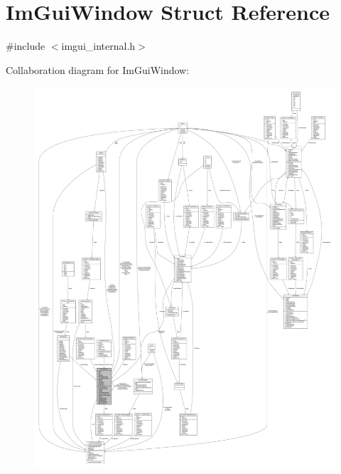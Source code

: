 \hypertarget{struct_im_gui_window}{}\section{Im\+Gui\+Window Struct Reference}
\label{struct_im_gui_window}


{\ttfamily \#include $<$imgui\+\_\+internal.\+h$>$}



Collaboration diagram for Im\+Gui\+Window\+:
\nopagebreak
\begin{figure}[H]
\begin{center}
\leavevmode
\includegraphics[width=350pt]{struct_im_gui_window__coll__graph}
\end{center}
\end{figure}
